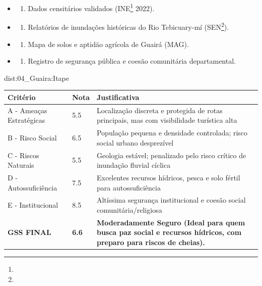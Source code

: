 {\begin{itemize}
\tightlist
\item
  \begin{enumerate}
  \def\labelenumi{\arabic{enumi})}
  \tightlist
  \item
    Dados censitários validados (INE\footnote{\fineINE} 2022).
  \end{enumerate}
\item
  \begin{enumerate}
  \def\labelenumi{\arabic{enumi})}
  \setcounter{enumi}{1}
  \tightlist
  \item
    Relatórios de inundações históricas do Rio Tebicuary-mí (SEN\footnote{\fineSEN}).
  \end{enumerate}
\item
  \begin{enumerate}
  \def\labelenumi{\arabic{enumi})}
  \setcounter{enumi}{2}
  \tightlist
  \item
    Mapa de solos e aptidão agrícola de Guairá (MAG).
  \end{enumerate}
\item
  \begin{enumerate}
  \def\labelenumi{\arabic{enumi})}
  \setcounter{enumi}{3}
  \tightlist
  \item
    Registro de segurança pública e coesão comunitária departamental.
  \end{enumerate}
\end{itemize}}{dist:04_Guaira:Itape}
\begin{table}[ht!]
\small \begin{tabular}{p{3.0cm}p{0.8cm}p{6.0cm}} \toprule
\textbf{Critério} & \textbf{Nota} & \textbf{Justificativa} \\ \midrule
A - Ameaças Estratégicas & 5.5 & Localização discreta e protegida de rotas principais, mas com visibilidade turística alta \\
B - Risco Social & 6.5 & População pequena e densidade controlada; risco social urbano desprezível \\
C - Riscos Naturais & 5.5 & Geologia estável; penalizado pelo risco crítico de inundação fluvial cíclica \\
D - Autossuficiência & 7.5 & Excelentes recursos hídricos, pesca e solo fértil para autossuficiência \\
E - Institucional & 8.5 & Altíssima segurança institucional e coesão social comunitária/\allowbreak religiosa \\
\midrule \textbf{GSS FINAL} & \textbf{6.6} & \textbf{Moderadamente Seguro (Ideal para quem busca paz social e recursos hídricos, com preparo para riscos de cheias).} \\ \bottomrule \end{tabular}
\end{table}
